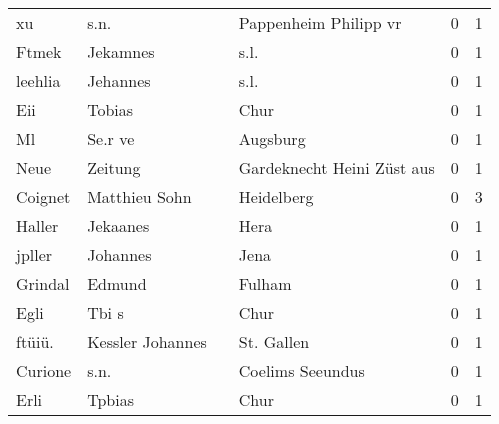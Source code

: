 \begin{tabular}{llllrr}
                       xu &                               s.n. &             &                       Pappenheim Philipp vr &          0 &         1 \\
                    Ftmek &                           Jekamnes &             &                                        s.l. &          0 &         1 \\
                  leehlia &                           Jehannes &             &                                        s.l. &          0 &         1 \\
                      Eii &                             Tobias &             &                                        Chur &          0 &         1 \\
                       Ml &                            Se.r ve &             &                                    Augsburg &          0 &         1 \\
                     Neue &                            Zeitung &             &                  Gardeknecht Heini Züst aus &          0 &         1 \\
                  Coignet &                      Matthieu Sohn &             &                                  Heidelberg &          0 &         3 \\
                   Haller &                           Jekaanes &             &                                        Hera &          0 &         1 \\
                   jpller &                           Johannes &             &                                        Jena &          0 &         1 \\
                  Grindal &                             Edmund &             &                                      Fulham &          0 &         1 \\
                     Egli &                              Tbi s &             &                                        Chur &          0 &         1 \\
                   ftüiü. &                   Kessler Johannes &             &                                  St. Gallen &          0 &         1 \\
                  Curione &                               s.n. &             &                            Coelims Seeundus &          0 &         1 \\
                     Erli &                             Tpbias &             &                                        Chur &          0 &         1 \\

\end{tabular}
